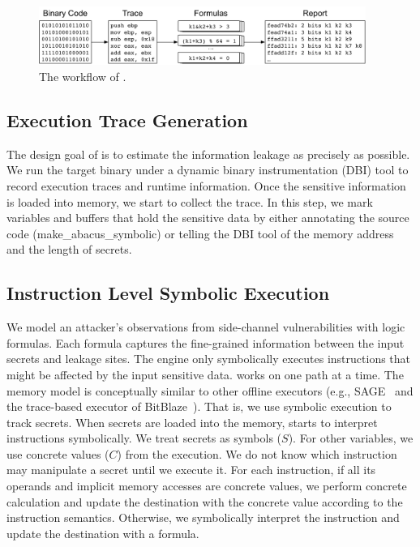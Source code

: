 \begin{figure}[ht]
    \centering
    \includegraphics[width=0.95\textwidth]{./figures/chapter4/workflow.pdf}
    \caption{The workflow of \tool{}.}
    \label{fig:workflow}
\end{figure}

\subsection{Execution Trace Generation} The design goal of \tool{} is to estimate the information leakage as precisely as possible.
We run the target binary under a dynamic binary instrumentation (DBI) tool
to record execution traces and runtime information.
Once the sensitive information is loaded into memory, we start to collect the trace.
In this step, we mark variables and buffers that hold the sensitive data by either annotating the source code (\textsf{make\_abacus\_symbolic}) or telling the DBI tool of the memory address and the length of secrets.

\subsection{Instruction Level Symbolic Execution} We model an attacker's
observations from side-channel vulnerabilities with logic formulas.
Each formula captures the fine-grained information between the input
secrets and leakage sites. The engine only symbolically executes
instructions that might be affected by the input sensitive data. \tool{} works on one path at a time. The memory model is conceptually similar to other offline executors (e.g., SAGE~\cite{godefroid2008automated} and the trace-based executor of BitBlaze~\cite{song2008bitblaze}). That is, we use symbolic execution to track secrets. When secrets are loaded into the memory, \tool{} starts to interpret instructions symbolically. We treat secrets as symbols ($S$). For other variables, we use concrete values ($C$) from the execution. We do not know which instruction may manipulate a secret until we execute it. For each instruction, if all its operands and implicit memory accesses are concrete values, we perform concrete calculation and update the destination with the concrete value according to the instruction semantics. Otherwise, we symbolically interpret the instruction and update the destination with a formula.

